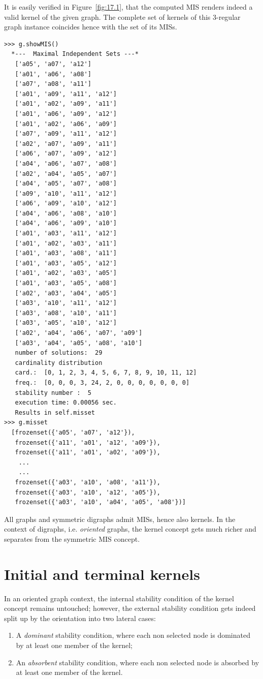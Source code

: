 It is easily verified in Figure~\vref{fig:17.1}, that the computed MIS renders indeed a valid kernel of the given graph. The complete set of kernels of this 3-regular graph instance coincides hence with the set of its MISs. 
\begin{lstlisting}[caption={Printing out all maximal independent sets of the random 3-regular graph},label=list:17.2]
>>> g.showMIS()
  *---  Maximal Independent Sets ---*
   ['a05', 'a07', 'a12']
   ['a01', 'a06', 'a08']
   ['a07', 'a08', 'a11']
   ['a01', 'a09', 'a11', 'a12']
   ['a01', 'a02', 'a09', 'a11']
   ['a01', 'a06', 'a09', 'a12']
   ['a01', 'a02', 'a06', 'a09']
   ['a07', 'a09', 'a11', 'a12']
   ['a02', 'a07', 'a09', 'a11']
   ['a06', 'a07', 'a09', 'a12']
   ['a04', 'a06', 'a07', 'a08']
   ['a02', 'a04', 'a05', 'a07']
   ['a04', 'a05', 'a07', 'a08']
   ['a09', 'a10', 'a11', 'a12']
   ['a06', 'a09', 'a10', 'a12']
   ['a04', 'a06', 'a08', 'a10']
   ['a04', 'a06', 'a09', 'a10']
   ['a01', 'a03', 'a11', 'a12']
   ['a01', 'a02', 'a03', 'a11']
   ['a01', 'a03', 'a08', 'a11']
   ['a01', 'a03', 'a05', 'a12']
   ['a01', 'a02', 'a03', 'a05']
   ['a01', 'a03', 'a05', 'a08']
   ['a02', 'a03', 'a04', 'a05']
   ['a03', 'a10', 'a11', 'a12']
   ['a03', 'a08', 'a10', 'a11']
   ['a03', 'a05', 'a10', 'a12']
   ['a02', 'a04', 'a06', 'a07', 'a09']
   ['a03', 'a04', 'a05', 'a08', 'a10']
   number of solutions:  29
   cardinality distribution
   card.:  [0, 1, 2, 3, 4, 5, 6, 7, 8, 9, 10, 11, 12]
   freq.:  [0, 0, 0, 3, 24, 2, 0, 0, 0, 0, 0, 0, 0]
   stability number :  5
   execution time: 0.00056 sec.
   Results in self.misset
>>> g.misset
  [frozenset({'a05', 'a07', 'a12'}),
   frozenset({'a11', 'a01', 'a12', 'a09'}),
   frozenset({'a11', 'a01', 'a02', 'a09'}),
    ...
    ...
   frozenset({'a03', 'a10', 'a08', 'a11'}),
   frozenset({'a03', 'a10', 'a12', 'a05'}),
   frozenset({'a03', 'a10', 'a04', 'a05', 'a08'})]
\end{lstlisting}

All graphs and symmetric digraphs admit MISs, hence also kernels. In the context of digraphs, i.e. \emph{oriented} graphs, the kernel concept gets much richer and separates from the symmetric MIS concept.  

\section{Initial and terminal kernels}
\label{sec:17.2}

In an oriented graph context, the internal stability condition of the kernel concept remains untouched; however, the external stability condition gets indeed split up by the orientation into two lateral cases:
\begin{enumerate}[topsep=1pt]
\item A \emph{dominant} stability condition, where each non selected node is dominated by at least one member of the kernel;
\item An \emph{absorbent} stability condition, where each non selected node is absorbed by at least one member of the kernel.
\end{enumerate}

